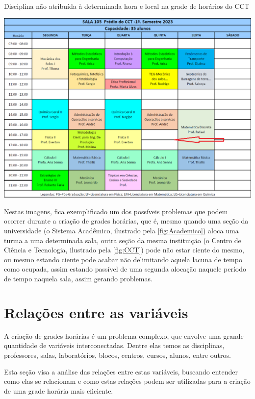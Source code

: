 \begin{MyCenteredFigure}
  \caption{Disciplina não atribuída à determinada hora e local na grade de horários do CCT}
  \label{fig:CCT}
  \includegraphics[width=\textwidth]{files/img/2.02!3-organizacao/2.02!3.1.5-erros/Aulas-CCT-105-2023_1}
\end{MyCenteredFigure}    %

Nestas imagens, fica exemplificado um dos possíveis problemas que podem ocorrer durante a criação de grades horárias, que é, mesmo quando uma seção da universidade (o Sistema Acadêmico, ilustrado pela \autoref{fig:Academico}) aloca uma turma a uma determinada sala, outra seção da mesma instituição (o Centro de Ciência e Tecnologia, ilustrado pela \autoref{fig:CCT}) pode não estar ciente do mesmo, ou mesmo estando ciente pode acabar não delimitando aquela lacuna de tempo como ocupada, assim estando passível de uma segunda alocação naquele período de tempo naquela sala, assim gerando problemas.

\section{Relações entre as variáveis} %

A criação de grades horárias é um problema complexo, que envolve uma grande quantidade de variáveis interconectadas. Dentre elas temos as disciplinas, professores, salas, laboratórios, blocos, centros, cursos, alunos, entre outros.

Esta seção visa a análise das relações entre estas variáveis, buscando entender como elas se relacionam e como estas relações podem ser utilizadas para a criação de uma grade horária mais eficiente.

